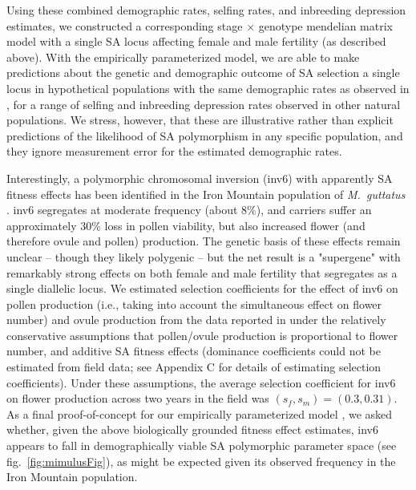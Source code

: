 \documentclass[11pt]{article}
\begin{document}
Using these combined demographic rates, selfing rates, and inbreeding depression estimates, we constructed a corresponding stage $\times$ genotype mendelian matrix model with a single SA locus affecting female and male fertility (as described above). With the empirically parameterized model, we are able to make predictions about the genetic and demographic outcome of SA selection a single locus in hypothetical populations with the same demographic rates as observed in \citet{PetersonEtAl2016}, for a range of selfing and inbreeding depression rates observed in other natural populations. We stress, however, that these are illustrative rather than explicit predictions of the likelihood of SA polymorphism in any specific population, and they ignore measurement error for the estimated demographic rates.

Interestingly, a polymorphic chromosomal inversion (inv6) with apparently SA fitness effects has been identified in the Iron Mountain population of {\itshape M.~guttatus} \citep{LeeKelly2015}. inv6 segregates at moderate frequency (about $8\%$), and carriers suffer an approximately $30 \%$ loss in pollen viability, but also increased flower (and therefore ovule and pollen) production. The genetic basis of these effects remain unclear -- though they likely polygenic -- but the net result is a "supergene" with remarkably strong effects on both female and male fertility that segregates as a single diallelic locus. We estimated selection coefficients for the effect of inv6 on pollen production (i.e., taking into account the simultaneous effect on flower number) and ovule production from the data reported in \citet{LeeKelly2015} under the relatively conservative assumptions that pollen/ovule production is proportional to flower number, and  additive SA fitness effects (dominance coefficients could not be estimated from field data; see Appendix C for details of estimating selection coefficients). Under these assumptions, the average selection coefficient for inv6 on flower production across two years in the field was $(s_f,s_m) = (0.3,0.31)$. As a final proof-of-concept for our empirically parameterized model \citep[e.g.,][]{Servedio2014}, we asked whether, given the above biologically grounded fitness effect estimates, inv6 appears to fall in demographically viable SA polymorphic parameter space (see fig.~\ref{fig:mimulusFig}), as might be expected given its observed frequency in the Iron Mountain population.
\end{document}
